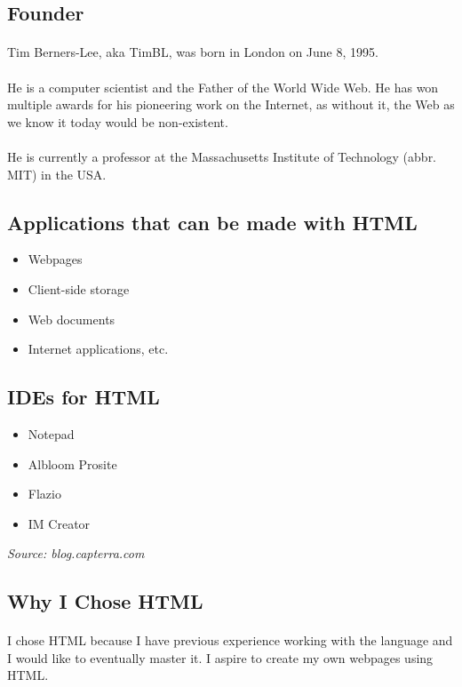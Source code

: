 \documentclass{article}
\begin{document}
\subsection{Founder}
\paragraph{}Tim Berners-Lee, aka TimBL, was born in London on June 8, 1995.
\paragraph{}He is a computer scientist and the Father of the World Wide Web.
He has won multiple awards for his pioneering work on the Internet, as without it, the Web as we know it today would be non-existent.
\paragraph{}He is currently a professor at the Massachusetts Institute of Technology (abbr. MIT) in the USA.
\subsection{Applications that can be made with HTML}
\begin{itemize}
	\item Webpages
	\item Client-side storage
	\item Web documents
	\item Internet applications, etc.
\end{itemize}
\subsection{IDEs for HTML}
\begin{itemize}
	\item Notepad
	\item Albloom Prosite
	\item Flazio
	\item IM Creator
\end{itemize}
\textit{Source: blog.capterra.com}
\subsection{Why I Chose HTML}
\paragraph{}I chose HTML because I have previous experience working with the language and I would like to eventually master it.
I aspire to create my own webpages using HTML.
\end{document}
